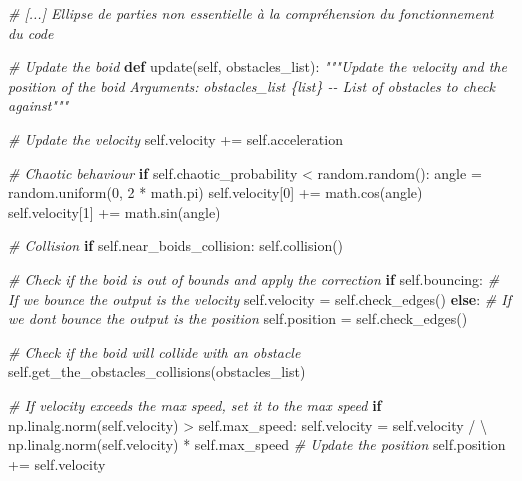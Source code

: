 \documentclass[
]{article}
\newenvironment{Shaded}{}{}
\newcommand{\CommentTok}[1]{\textcolor[rgb]{0.38,0.63,0.69}{\textit{#1}}}
\newcommand{\ControlFlowTok}[1]{\textcolor[rgb]{0.00,0.44,0.13}{\textbf{#1}}}
\newcommand{\DecValTok}[1]{\textcolor[rgb]{0.25,0.63,0.44}{#1}}
\newcommand{\KeywordTok}[1]{\textcolor[rgb]{0.00,0.44,0.13}{\textbf{#1}}}
\newcommand{\NormalTok}[1]{#1}
\newcommand{\OperatorTok}[1]{\textcolor[rgb]{0.40,0.40,0.40}{#1}}
\newcommand{\VariableTok}[1]{\textcolor[rgb]{0.10,0.09,0.49}{#1}}
\begin{document}
\begin{Shaded}
\begin{Highlighting}[]
\CommentTok{\# [...] Ellipse de parties non essentielle à la compréhension du fonctionnement du code}

\CommentTok{\# Update the boid}
\KeywordTok{def}\NormalTok{ update(}\VariableTok{self}\NormalTok{, obstacles\_list):}
    \CommentTok{"""Update the velocity and the position of the boid}
\CommentTok{    Arguments:}
\CommentTok{        obstacles\_list \{list\} {-}{-} List of obstacles to check against"""}

    \CommentTok{\# Update the velocity}
    \VariableTok{self}\NormalTok{.velocity }\OperatorTok{+=} \VariableTok{self}\NormalTok{.acceleration}

    \CommentTok{\# Chaotic behaviour}
    \ControlFlowTok{if} \VariableTok{self}\NormalTok{.chaotic\_probability }\OperatorTok{\textless{}}\NormalTok{ random.random():}
\NormalTok{        angle }\OperatorTok{=}\NormalTok{ random.uniform(}\DecValTok{0}\NormalTok{, }\DecValTok{2} \OperatorTok{*}\NormalTok{ math.pi)}
        \VariableTok{self}\NormalTok{.velocity[}\DecValTok{0}\NormalTok{] }\OperatorTok{+=}\NormalTok{ math.cos(angle)}
        \VariableTok{self}\NormalTok{.velocity[}\DecValTok{1}\NormalTok{] }\OperatorTok{+=}\NormalTok{ math.sin(angle)}

    \CommentTok{\# Collision}
    \ControlFlowTok{if} \VariableTok{self}\NormalTok{.near\_boids\_collision:}
        \VariableTok{self}\NormalTok{.collision()}

    \CommentTok{\# Check if the boid is out of bounds and apply the correction}
    \ControlFlowTok{if} \VariableTok{self}\NormalTok{.bouncing:}
        \CommentTok{\# If we bounce the output is the velocity}
        \VariableTok{self}\NormalTok{.velocity }\OperatorTok{=} \VariableTok{self}\NormalTok{.check\_edges()}
    \ControlFlowTok{else}\NormalTok{:}
        \CommentTok{\# If we don\textquotesingle{}t bounce the output is the position}
        \VariableTok{self}\NormalTok{.position }\OperatorTok{=} \VariableTok{self}\NormalTok{.check\_edges()}

    \CommentTok{\# Check if the boid will collide with an obstacle}
    \VariableTok{self}\NormalTok{.get\_the\_obstacles\_collisions(obstacles\_list)}

    \CommentTok{\# If velocity exceeds the max speed, set it to the max speed}
    \ControlFlowTok{if}\NormalTok{ np.linalg.norm(}\VariableTok{self}\NormalTok{.velocity) }\OperatorTok{\textgreater{}} \VariableTok{self}\NormalTok{.max\_speed:}
        \VariableTok{self}\NormalTok{.velocity }\OperatorTok{=} \VariableTok{self}\NormalTok{.velocity }\OperatorTok{/} \OperatorTok{\textbackslash{}}
\NormalTok{            np.linalg.norm(}\VariableTok{self}\NormalTok{.velocity) }\OperatorTok{*} \VariableTok{self}\NormalTok{.max\_speed}
    \CommentTok{\# Update the position}
    \VariableTok{self}\NormalTok{.position }\OperatorTok{+=} \VariableTok{self}\NormalTok{.velocity}


\end{Highlighting}
\end{Shaded}
\end{document}
